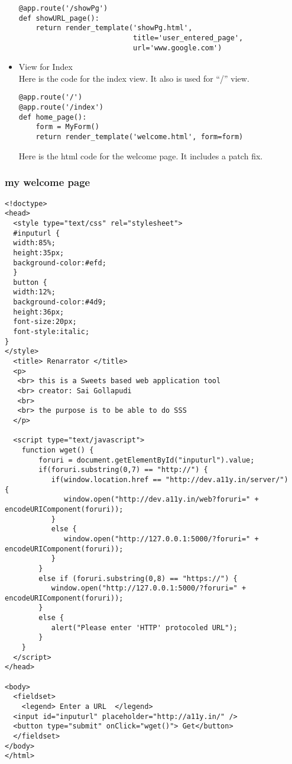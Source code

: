\documentclass[11pt]{article}
\begin{document}
\begin{itemize}
\begin{verbatim}
@app.route('/showPg')
def showURL_page():
    return render_template('showPg.html', 
                           title='user_entered_page', 
                           url='www.google.com')
\end{verbatim}


\item View for Index\\
\label{sec-4-2-2-3}%
Here is the code for the index view. It also is used for ``/'' view.

\begin{verbatim}
@app.route('/')
@app.route('/index')
def home_page():
    form = MyForm()
    return render_template('welcome.html', form=form)
\end{verbatim}

Here is the html code for the welcome  page. It includes a patch fix.
\end{itemize} %
\subsubsection{my welcome page}
\label{sec-4-2-3}


\begin{verbatim}
<!doctype>
<head>
  <style type="text/css" rel="stylesheet">
  #inputurl {
  width:85%;
  height:35px;
  background-color:#efd;
  }
  button {
  width:12%;
  background-color:#4d9;
  height:36px;
  font-size:20px;
  font-style:italic;
}
</style>
  <title> Renarrator </title>
  <p>
   <br> this is a Sweets based web application tool
   <br> creator: Sai Gollapudi
   <br>
   <br> the purpose is to be able to do SSS
  </p>

  <script type="text/javascript">
    function wget() {
        foruri = document.getElementById("inputurl").value;
        if(foruri.substring(0,7) == "http://") {
           if(window.location.href == "http://dev.a11y.in/server/")    {
              window.open("http://dev.a11y.in/web?foruri=" + encodeURIComponent(foruri));
           }
           else {
              window.open("http://127.0.0.1:5000/?foruri=" + encodeURIComponent(foruri));
           }
        }
        else if (foruri.substring(0,8) == "https://") {
           window.open("http://127.0.0.1:5000/?foruri=" + encodeURIComponent(foruri));
        }
        else {
           alert("Please enter 'HTTP' protocoled URL");
        }
    }
  </script>
</head>

<body>
  <fieldset>
    <legend> Enter a URL  </legend>
  <input id="inputurl" placeholder="http://a11y.in/" />
  <button type="submit" onClick="wget()"> Get</button>
  </fieldset>
</body>
</html>
\end{verbatim}
\end{document}
